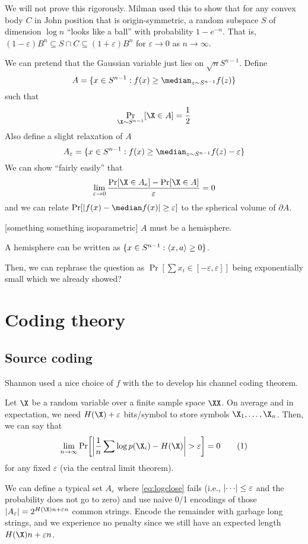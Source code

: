 \documentclass[class=co432,notes,tikz]{agony}
\begin{document}
We will not prove this rigorously.
Milman used this to show that for any convex body $C$ in John position
that is origin-symmetric, a random subspace $S$ of dimension $\log n$
``looks like a ball'' with probability $1-e^{-n}$.
That is, $(1-\varepsilon)B^n \subseteq S \cap C \subseteq (1+\varepsilon)B^n$
for $\varepsilon \to 0$ as $n \to \infty$.

\begin{prf}
  We can pretend that the Gaussian variable just lies on $\sqrt{n}S^{n-1}$.
  Define \[ A = \{x\in S^{n-1} : f(x) \geq \median_{z\sim S^{n-1}} f(z)\} \]
  such that \[ \Pr_{\X\sim S^{n-1}}[\X\in A] = \frac12 \]
  Also define a slight relaxation of $A$
  \[ A_\varepsilon = \{x\in S^{n-1} : f(x) \geq \median_{z\sim S^{n-1}} f(z) - \varepsilon\} \]
  We can show ``fairly easily'' that
  \[ \lim_{\varepsilon\to0}\frac{\Pr[\X\in A_e]-\Pr[\X\in A]}{\varepsilon} = 0 \]
  and we can relate $\Pr[\abs{f(x)-\median f(x)} \geq \varepsilon]$
  to the spherical volume of $\partial A$.

  [something something isoparametric] $A$ must be a hemisphere.

  A hemisphere can be written as $\{ x \in S^{n-1} : \ev{x,a} \geq 0 \}$.

  Then, we can rephrase the question as
  $\Pr[\sum x_i \in [-\varepsilon,\varepsilon]]$ being exponentially small
  which we already showed?
\end{prf}

\chapter{Coding theory}

\section{Source coding}

Shannon used a nice choice of $f$ with the 
to develop his channel coding theorem.

Let $\X$ be a random variable over a finite sample space $\XX$.
On average and in expectation, we need $H(\X)+\varepsilon$ bits/symbol
to store symbols $\X_1,\dotsc,\X_n$. Then, we can say that
\[
  \lim_{n\to\infty}\Pr[\abs{\frac1n\sum \log p(\X_i) - H(\X)} > \varepsilon] = 0 \nr{eq:logclose}
\]
for any fixed $\varepsilon$ (via the central limit theorem).

We can define a typical set $A_\varepsilon$ where \cref{eq:logclose} fails
(i.e., $\abs{\cdots} \leq \varepsilon$ and the probability does not go to zero)
and use naive 0/1 encodings of those $\abs{A_\varepsilon} = 2^{H(\X)n + \varepsilon n}$ common strings.
Encode the remainder with garbage long strings,
and we experience no penalty since we still have
an expected length $H(\X)n + \varepsilon n$.
\end{document}
